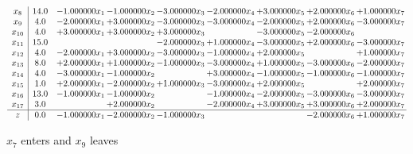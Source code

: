 \documentclass[10pt]{article}
\begin{document}
\[\begin{array}{c| c c@{\hskip 2pt} c@{\hskip 2pt} c@{\hskip 2pt} c@{\hskip 2pt} c@{\hskip 2pt} c@{\hskip 2pt} c@{\hskip 2pt} }
 x_{8}   &  14.0 & -1.000000 x_{1} & -1.000000 x_{2} & -3.000000 x_{3} & -2.000000 x_{4} & + 3.000000 x_{5} & + 2.000000 x_{6} & + 1.000000 x_{7}\\
 x_{9}   &  4.0 & -2.000000 x_{1} & + 3.000000 x_{2} & -3.000000 x_{3} & -3.000000 x_{4} & -2.000000 x_{5} & + 2.000000 x_{6} & -3.000000 x_{7}\\
 x_{10}   &  4.0 & + 3.000000 x_{1} & + 3.000000 x_{2} & + 3.000000 x_{3} &   & -3.000000 x_{5} & -2.000000 x_{6} &   \\
 x_{11}   &  15.0  &    &   & -2.000000 x_{3} & + 1.000000 x_{4} & -3.000000 x_{5} & + 2.000000 x_{6} & -3.000000 x_{7}\\
 x_{12}   &  4.0 & -2.000000 x_{1} & + 3.000000 x_{2} & -3.000000 x_{3} & -1.000000 x_{4} & + 2.000000 x_{5} &   & + 1.000000 x_{7}\\
 x_{13}   &  8.0 & + 2.000000 x_{1} & + 1.000000 x_{2} & -1.000000 x_{3} & -3.000000 x_{4} & + 1.000000 x_{5} & -3.000000 x_{6} & -2.000000 x_{7}\\
 x_{14}   &  4.0 & -3.000000 x_{1} & -1.000000 x_{2} &   & + 3.000000 x_{4} & -1.000000 x_{5} & -1.000000 x_{6} & -1.000000 x_{7}\\
 x_{15}   &  1.0 & + 2.000000 x_{1} & -2.000000 x_{2} & + 1.000000 x_{3} & -3.000000 x_{4} & + 2.000000 x_{5} &   & + 2.000000 x_{7}\\
 x_{16}   &  13.0 & -1.000000 x_{1} & -1.000000 x_{2} &   & -1.000000 x_{4} & -2.000000 x_{5} & -3.000000 x_{6} & -3.000000 x_{7}\\
 x_{17}   &  3.0  &   & + 2.000000 x_{2} &   & -2.000000 x_{4} & + 3.000000 x_{5} & + 3.000000 x_{6} & + 2.000000 x_{7}\\
\hline
z    &  0.0 & -1.000000 x_{1} & -2.000000 x_{2} & -1.000000 x_{3} &    &   & -2.000000 x_{6} & + 1.000000 x_{7}\\
\end{array}\]


 $ x_{7} $ enters and $ x_{9} $ leaves 
\end{document}
